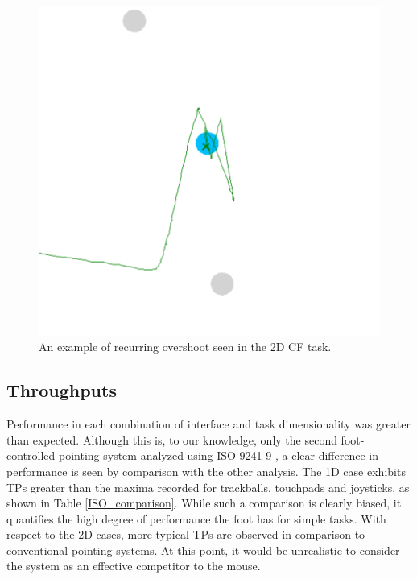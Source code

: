 \documentclass [12pt,letterpaper]{report}
\begin{document}
\begin{figure}[tpb]
  \centering
  \includegraphics[scale=0.35]{fig/overshoot_2D_CF}
  \caption{An example of recurring overshoot seen in the 2D CF task.}
  \label{overshoot_2D_CF}
\end{figure}

\subsection{Throughputs}

Performance in each combination of interface and task dimensionality was greater than expected. Although this is, to our knowledge, only the second foot-controlled pointing system analyzed using ISO 9241-9 \cite{velloso2015interactions}, a clear difference in performance is seen by comparison with the other analysis. The 1D case exhibits TPs greater than the maxima recorded for trackballs, touchpads and joysticks, as shown in Table \ref{ISO_comparison}. While such a comparison is clearly biased, it quantifies the high degree of performance the foot has for simple tasks. With respect to the 2D cases, more typical TPs are observed in comparison to conventional pointing systems. At this point, it would be unrealistic to consider the system as an effective competitor to the mouse.
\end{document}
